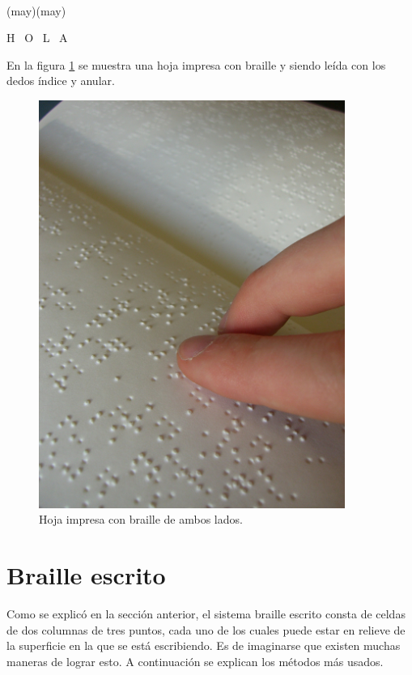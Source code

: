 \begin{center}
    
\\
\begin{scriptsize}(may)(may)\end{scriptsize} H \, O \, L \, A\\
\end{center}

En la figura \ref{fig:136208618_133a735f4f_b_d.jpg} se muestra una hoja
impresa con braille y siendo le\'ida con los dedos \'indice y anular.

\begin{figure}[htp]
\centering
\includegraphics[width=10cm]{./img/136208618_133a735f4f_b_d.jpg}
\caption{Hoja impresa con braille de ambos lados.}
\label{fig:136208618_133a735f4f_b_d.jpg}
\end{figure}

\newpage
\section{Braille escrito}
%
Como se explic\'o en la secci\'on anterior, el sistema braille escrito consta
de celdas de dos columnas de tres puntos, cada uno de los cuales puede estar
en relieve de la superficie en la que se est\'a escribiendo. Es de imaginarse
que existen muchas maneras de lograr esto. A continuaci\'on se explican los
m\'etodos m\'as usados.

